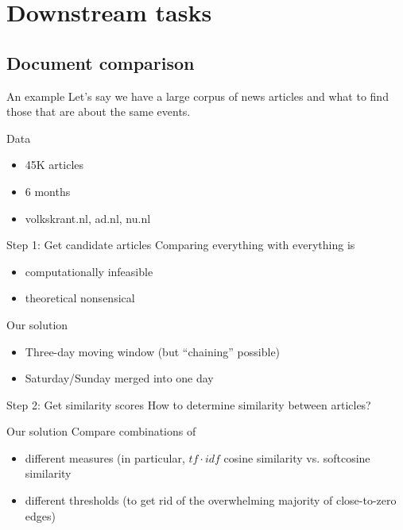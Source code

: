 \section{Downstream tasks}

\subsection{Document comparison}


\begin{frame}{An example \parencite{Trilling2021}}
  Let's say we have a large corpus of news articles and what to find those that are about the same events.
  
\end{frame}


\begin{frame}{Data}
  \begin{itemize}
  \item 45K articles
  \item 6 months
  \item volkskrant.nl, ad.nl, nu.nl
  \end{itemize}
\end{frame}



\begin{frame}{Step 1: Get candidate articles}
  Comparing everything with everything is
  \begin{itemize}
  \item computationally infeasible
  \item theoretical nonsensical
  \end{itemize}
  
  \begin{block}{Our solution}
    \begin{itemize}
    \item Three-day moving window (but ``chaining'' possible)
    \item  Saturday/Sunday merged into one day
    \end{itemize}
  \end{block}
  
\end{frame}




\begin{frame}{Step 2: Get similarity scores}
  How to determine similarity between articles?
  \begin{block}{Our solution}
  Compare combinations of 
  \begin{itemize}
  \item different measures (in particular, $tf\cdot idf$ cosine similarity vs. softcosine similarity
  \item different thresholds (to get rid of the overwhelming majority of close-to-zero edges) 
  \end{itemize}
\end{block}
\end{frame}


